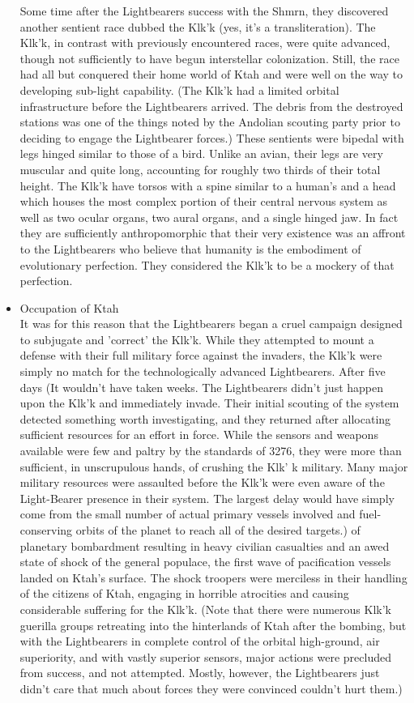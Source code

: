 \begin{itemize}
Some time after the Lightbearers success with the Shmrn, they
discovered another sentient race dubbed the Klk'k (yes, it's a
transliteration).  The Klk'k, in contrast with previously encountered
races, were quite advanced, though not sufficiently to have begun
interstellar colonization.  Still, the race had all but conquered
their home world of Ktah and were well on the way to developing
sub-light capability. (The Klk'k had a limited orbital infrastructure
before the Lightbearers arrived. The debris from the destroyed
stations was one of the things noted by the Andolian scouting party
prior to deciding to engage the Lightbearer forces.)  These sentients
were bipedal with legs hinged similar to those of a bird.  Unlike an
avian, their legs are very muscular and quite long, accounting for
roughly two thirds of their total height.  The Klk'k have torsos with
a spine similar to a human's and a head which houses the most complex
portion of their central nervous system as well as two ocular organs,
two aural organs, and a single hinged jaw.  In fact they are
sufficiently anthropomorphic that their very existence was an affront
to the Lightbearers who believe that humanity is the embodiment of
evolutionary perfection.  They considered the Klk'k to be a mockery of
that perfection.

\item Occupation of Ktah \\

It was for this reason that the Lightbearers began a cruel campaign
designed to subjugate and 'correct' the Klk'k.  While they attempted
to mount a defense with their full military force against the
invaders, the Klk'k were simply no match for the technologically
advanced Lightbearers.  After five days (It wouldn't have taken
weeks. The Lightbearers didn't just happen upon the Klk'k and
immediately invade. Their initial scouting of the system detected
something worth investigating, and they returned after allocating
sufficient resources for an effort in force. While the sensors and
weapons available were few and paltry by the standards of 3276, they
were more than sufficient, in unscrupulous hands, of crushing the Klk'
k military. Many major military resources were assaulted before the
Klk'k were even aware of the Light-Bearer presence in their
system. The largest delay would have simply come from the small number
of actual primary vessels involved and fuel-conserving orbits of the
planet to reach all of the desired targets.) of planetary bombardment
resulting in heavy civilian casualties and an awed state of shock of
the general populace, the first wave of pacification vessels landed on
Ktah's surface.  The shock troopers were merciless in their handling
of the citizens of Ktah, engaging in horrible atrocities and causing
considerable suffering for the Klk'k. (Note that there were numerous
Klk'k guerilla groups retreating into the hinterlands of Ktah after
the bombing, but with the Lightbearers in complete control of the
orbital high-ground, air superiority, and with vastly superior
sensors, major actions were precluded from success, and not
attempted. Mostly, however, the Lightbearers just didn't care that
much about forces they were convinced couldn't hurt them.)


\end{itemize}
